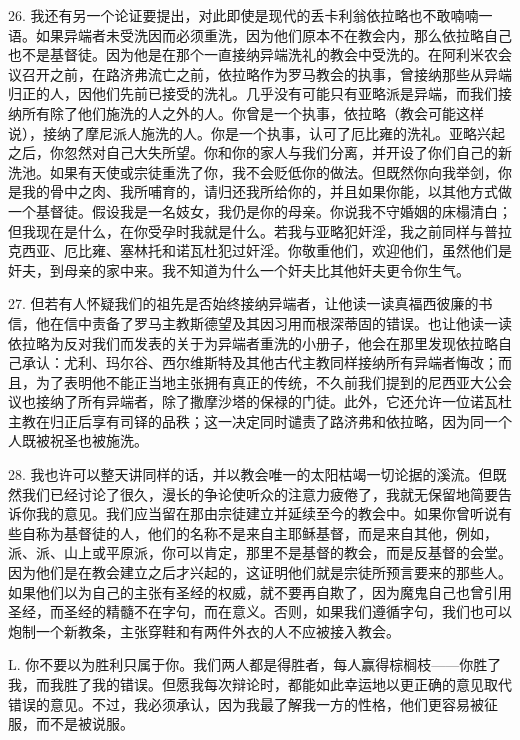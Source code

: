 26. 我还有另一个论证要提出，对此即使是现代的丢卡利翁依拉略也不敢喃喃一语。如果异端者未受洗因而必须重洗，因为他们原本不在教会内，那么依拉略自己也不是基督徒。因为他是在那个一直接纳异端洗礼的教会中受洗的。在阿利米农会议召开之前，在路济弗流亡之前，依拉略作为罗马教会的执事，曾接纳那些从异端归正的人，因他们先前已接受的洗礼。几乎没有可能只有亚略派是异端，而我们接纳所有除了他们施洗的人之外的人。你曾是一个执事，依拉略（教会可能这样说），接纳了摩尼派人施洗的人。你是一个执事，认可了厄比雍的洗礼。亚略兴起之后，你忽然对自己大失所望。你和你的家人与我们分离，并开设了你们自己的新洗池。如果有天使或宗徒重洗了你，我不会贬低你的做法。但既然你向我举剑，你是我的骨中之肉、我所哺育的，请归还我所给你的，并且如果你能，以其他方式做一个基督徒。假设我是一名妓女，我仍是你的母亲。你说我不守婚姻的床榻清白；但我现在是什么，在你受孕时我就是什么。若我与亚略犯奸淫，我之前同样与普拉克西亚、厄比雍、塞林托和诺瓦杜犯过奸淫。你敬重他们，欢迎他们，虽然他们是奸夫，到母亲的家中来。我不知道为什么一个奸夫比其他奸夫更令你生气。\par

27. 但若有人怀疑我们的祖先是否始终接纳异端者，让他读一读真福西彼廉的书信，他在信中责备了罗马主教斯德望及其因习用而根深蒂固的错误。也让他读一读依拉略为反对我们而发表的关于为异端者重洗的小册子，他会在那里发现依拉略自己承认：尤利、玛尔谷、西尔维斯特及其他古代主教同样接纳所有异端者悔改；而且，为了表明他不能正当地主张拥有真正的传统，不久前我们提到的尼西亚大公会议也接纳了所有异端者，除了撒摩沙塔的保禄的门徒。此外，它还允许一位诺瓦杜主教在归正后享有司铎的品秩；这一决定同时谴责了路济弗和依拉略，因为同一个人既被祝圣也被施洗。\par

28. 我也许可以整天讲同样的话，并以教会唯一的太阳枯竭一切论据的溪流。但既然我们已经讨论了很久，漫长的争论使听众的注意力疲倦了，我就无保留地简要告诉你我的意见。我们应当留在那由宗徒建立并延续至今的教会中。如果你曾听说有些自称为基督徒的人，他们的名称不是来自主耶稣基督，而是来自其他，例如，派、派、山上或平原派，你可以肯定，那里不是基督的教会，而是反基督的会堂。因为他们是在教会建立之后才兴起的，这证明他们就是宗徒所预言要来的那些人。如果他们以为自己的主张有圣经的权威，就不要再自欺了，因为魔鬼自己也曾引用圣经，而圣经的精髓不在字句，而在意义。否则，如果我们遵循字句，我们也可以炮制一个新教条，主张穿鞋和有两件外衣的人不应被接入教会。\par

L. 你不要以为胜利只属于你。我们两人都是得胜者，每人赢得棕榈枝——你胜了我，而我胜了我的错误。但愿我每次辩论时，都能如此幸运地以更正确的意见取代错误的意见。不过，我必须承认，因为我最了解我一方的性格，他们更容易被征服，而不是被说服。\par

